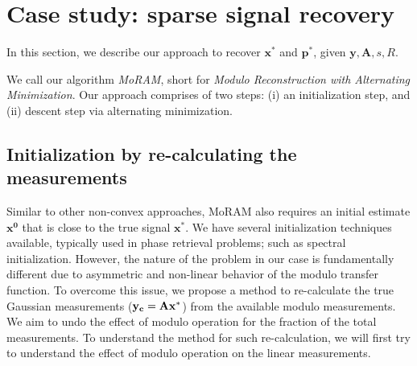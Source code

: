\section{Case study: sparse signal recovery}
\label{sec:algo}
In this section, we describe our approach to recover $\mathbf{x^*}$ and $\mathbf{p^*}$, given $\mathbf{y, A}, s, R$. 

We call our algorithm \emph{MoRAM}, short for \emph{Modulo Reconstruction with Alternating Minimization}. Our approach comprises of two steps: (i) an initialization step, and (ii) descent step via alternating minimization.

\subsection{Initialization by re-calculating the measurements}
\label{sec:init}
Similar to other non-convex approaches, MoRAM also requires an initial estimate $\mathbf{{x}^0}$ that is close to the true signal $\mathbf{{x}^*}$. We have several initialization techniques available, typically used in phase retrieval problems; such as spectral initialization. However, the nature of the problem in our case is fundamentally different due to asymmetric and non-linear behavior of the modulo transfer function. To overcome this issue, we propose a method to re-calculate the true Gaussian measurements ($\mathbf{y_c}= \mathbf{Ax^*}$) from the available modulo measurements. We aim to undo the effect of modulo operation for the fraction of the total measurements. To understand the method for such re-calculation, we will first try to understand the effect of modulo operation on the linear measurements.

